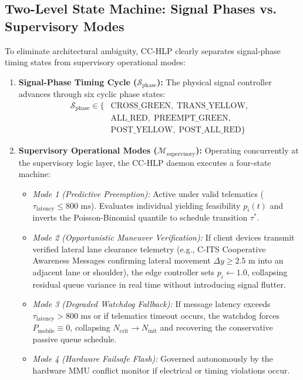 \documentclass[journal,10pt,twocolumn]{IEEEtran}
\begin{document}
\subsection{Two-Level State Machine: Signal Phases vs. Supervisory Modes}
To eliminate architectural ambiguity, CC-HLP clearly separates signal-phase timing states from supervisory operational modes:
\begin{enumerate}
    \item \textbf{Signal-Phase Timing Cycle ($\mathcal{S}_{\text{phase}}$):} The physical signal controller advances through six cyclic phase states:
    \begin{equation}
    \begin{aligned}
    \mathcal{S}_{\text{phase}} \in \bigl\{ & \text{CROSS\_GREEN}, \; \text{TRANS\_YELLOW}, \\[2pt]
    & \text{ALL\_RED}, \; \text{PREEMPT\_GREEN}, \\[2pt]
    & \text{POST\_YELLOW}, \; \text{POST\_ALL\_RED} \bigr\}
    \end{aligned}
    \end{equation}
    \item \textbf{Supervisory Operational Modes ($\mathcal{M}_{\text{supervisory}}$):} Operating concurrently at the supervisory logic layer, the CC-HLP daemon executes a four-state machine:
    \begin{itemize}
        \item \emph{Mode 1 (Predictive Preemption):} Active under valid telematics ($\tau_{\text{latency}} \le 800\text{ ms}$). Evaluates individual yielding feasibility $p_i(t)$ and inverts the Poisson-Binomial quantile to schedule transition $\tau^*$.
        \item \emph{Mode 2 (Opportunistic Maneuver Verification):} If client devices transmit verified lateral lane clearance telemetry (e.g., C-ITS Cooperative Awareness Messages confirming lateral movement $\Delta y \ge 2.5\text{ m}$ into an adjacent lane or shoulder), the edge controller sets $p_i \leftarrow 1.0$, collapsing residual queue variance in real time without introducing signal flutter.
        \item \emph{Mode 3 (Degraded Watchdog Fallback):} If message latency exceeds $\tau_{\text{latency}} > 800\text{ ms}$ or if telematics timeout occurs, the watchdog forces $P_{\text{mobile}} \equiv 0$, collapsing $N_{\text{crit}} \to N_{\text{init}}$ and recovering the conservative passive queue schedule.
        \item \emph{Mode 4 (Hardware Failsafe Flash):} Governed autonomously by the hardware MMU conflict monitor if electrical or timing violations occur.
    \end{itemize}
\end{enumerate}
\end{document}
